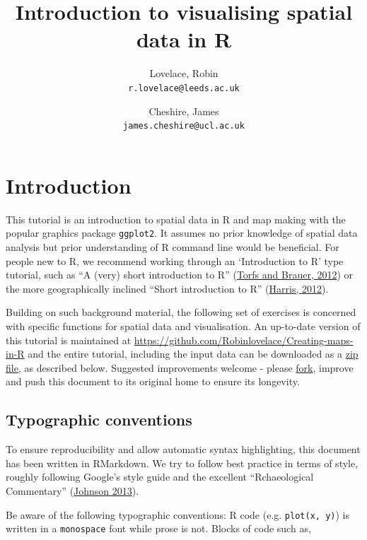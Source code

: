 \documentclass[]{article}
\author{Lovelace, Robin\\
\texttt{r.lovelace@leeds.ac.uk}
\and
Cheshire, James\\
\texttt{james.cheshire@ucl.ac.uk}
}
\title{Introduction to visualising spatial data in R}
\begin{document}
\maketitle

\section{Introduction}

This tutorial is an introduction to spatial data in R and map making
with the popular graphics package \texttt{ggplot2}. It assumes no prior
knowledge of spatial data analysis but prior understanding of R command
line would be beneficial. For people new to R, we recommend working
through an `Introduction to R' type tutorial, such as ``A (very) short
introduction to R''
(\href{http://cran.r-project.org/doc/contrib/Torfs+Brauer-Short-R-Intro.pdf}{Torfs
and Brauer, 2012}) or the more geographically inclined ``Short
introduction to R''
(\href{http://www.social-statistics.org/wp-content/uploads/2012/12/intro\_to\_R1.pdf}{Harris,
2012}).

Building on such background material, the following set of exercises is
concerned with specific functions for spatial data and visualisation. An
up-to-date version of this tutorial is maintained at
\href{https://github.com/Robinlovelace/Creating-maps-in-R/blob/master/intro-spatial-rl.pdf}{https://github.com/Robinlovelace/Creating-maps-in-R}
and the entire tutorial, including the input data can be downloaded as a
\href{https://github.com/Robinlovelace/Creating-maps-in-R/archive/master.zip}{zip
file}, as described below. Suggested improvements welcome - please
\href{https://help.github.com/articles/fork-a-repo}{fork}, improve and
push this document to its original home to ensure its longevity.

\subsection{Typographic conventions}

To ensure reproducibility and allow automatic syntax highlighting, this
document has been written in RMarkdown. We try to follow best practice
in terms of style, roughly following Google's style guide and the
excellent ``Rchaeological Commentary''
(\href{http://cran.r-project.org/web/packages/rockchalk/vignettes/Rstyle.pdf}{Johnson
2013}).

Be aware of the following typographic conventions: R code (e.g.
\texttt{plot(x, y)}) is written in a \texttt{monospace} font while prose
is not. Blocks of code such as,
\end{document}
